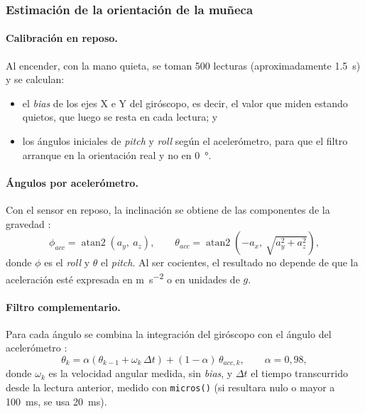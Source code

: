 \subsubsection{Estimación de la orientación de la muñeca}
\label{sec:fusion}

\paragraph{Calibración en reposo.} Al encender, con la mano quieta, se toman 500 lecturas (aproximadamente \SI{1.5}{\second}) y se calculan:
\begin{itemize}
    \item el \textit{bias} de los ejes X e Y del giróscopo, es decir, el valor que miden estando quietos, que luego se resta en cada lectura; y
    \item los ángulos iniciales de \textit{pitch} y \textit{roll} según el acelerómetro, para que el filtro arranque en la orientación real y no en \SI{0}{\degree}.
\end{itemize}

\paragraph{Ángulos por acelerómetro.} Con el sensor en reposo, la inclinación se obtiene de las componentes de la gravedad \cite{pedley_an3461}:
\begin{equation}
\phi_{acc} = \operatorname{atan2}\left(a_y,\ a_z\right), \qquad
\theta_{acc} = \operatorname{atan2}\left(-a_x,\ \sqrt{a_y^2 + a_z^2}\right),
\label{eq:angulos_acc}
\end{equation}
donde $\phi$ es el \textit{roll} y $\theta$ el \textit{pitch}. Al ser cocientes, el resultado no depende de que la aceleración esté expresada en \si{\meter\per\second\squared} o en unidades de $g$.

\paragraph{Filtro complementario.} Para cada ángulo se combina la integración del giróscopo con el ángulo del acelerómetro \cite{colton2007, mahony2008}:
\begin{equation}
\theta_k = \alpha\left(\theta_{k-1} + \omega_k\,\Delta t\right) + (1-\alpha)\,\theta_{acc,k}, \qquad \alpha = 0{,}98,
\label{eq:complementario}
\end{equation}
donde $\omega_k$ es la velocidad angular medida, sin \textit{bias}, y $\Delta t$ el tiempo transcurrido desde la lectura anterior, medido con \texttt{micros()} (si resultara nulo o mayor a \SI{100}{\milli\second}, se usa \SI{20}{\milli\second}).

